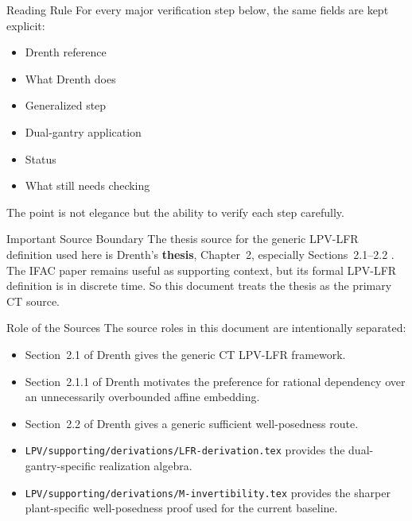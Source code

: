 ﻿\documentclass[11pt]{article}
\begin{document}
\begin{notebox}{Reading Rule}
For every major verification step below, the same fields are kept explicit:
\begin{itemize}[leftmargin=1.2em]
    \item Drenth reference
    \item What Drenth does
    \item Generalized step
    \item Dual-gantry application
    \item Status
    \item What still needs checking
\end{itemize}
The point is not elegance but the ability to verify each step carefully.
\end{notebox}

\begin{warningbox}{Important Source Boundary}
The thesis source for the generic LPV-LFR definition used here is Drenth's
\textbf{thesis}, Chapter~2, especially Sections~2.1--2.2
\cite{drenth2025thesis}. The IFAC paper \cite{drenth2025lpvlfr} remains useful
as supporting context, but its formal LPV-LFR definition is in discrete time.
So this document treats the thesis as the primary CT source.
\end{warningbox}

\begin{notebox}{Role of the Sources}
The source roles in this document are intentionally separated:
\begin{itemize}[leftmargin=1.2em]
    \item Section~2.1 of Drenth gives the generic CT LPV-LFR framework.
    \item Section~2.1.1 of Drenth motivates the preference for rational
    dependency over an unnecessarily overbounded affine embedding.
    \item Section~2.2 of Drenth gives a generic sufficient well-posedness route.
    \item \texttt{LPV/supporting/derivations/LFR-derivation.tex} provides the dual-gantry-specific
    realization algebra.
    \item \texttt{LPV/supporting/derivations/M-invertibility.tex} provides the sharper
    plant-specific well-posedness proof used for the current baseline.
\end{itemize}
\end{notebox}

\end{document}
